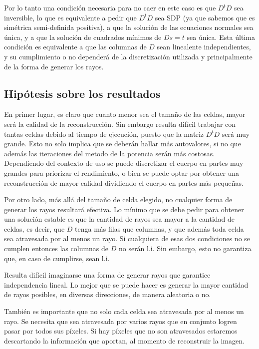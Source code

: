 \documentclass[a4paper]{article}
\begin{document}
Por lo tanto una condición necesaria para no caer en este caso es que $D^tD$ sea inversible, lo que es equivalente a pedir que $D^tD$ sea SDP (ya que 
sabemos que es simétrica semi-definida positiva), a que la solución de las ecuaciones normales sea única, y a que la solución de cuadrados mínimos de 
$Ds = t$ sea única. Esta última condición es equivalente a que las columnas de $D$ sean linealente independientes, y su cumplimiento o no dependerá 
de la discretización utilizada y principalmente de la forma de generar los rayos.

\subsection{Hipótesis sobre los resultados}

En primer lugar, es claro que cuanto menor sea el tamaño de las celdas, mayor será la calidad de la reconstrucción. Sin embargo resulta difícil 
trabajar con tantas celdas debido al tiempo de ejecución, puesto que la matriz $D^tD$ será muy grande. Esto no solo implica que se deberán hallar 
más autovalores, si no que además las iteraciones del metodo de la potencia serán más costosas. Dependiendo del contexto de uso se puede discretizar 
el cuerpo en partes muy grandes para priorizar el rendimiento, o bien se puede optar por obtener una reconstrucción de mayor calidad dividiendo el 
cuerpo en partes más pequeñas.

Por otro lado, más allá del tamaño de celda elegido, no cualquier forma de generar los rayos resultará efectiva. Lo mínimo que se debe pedir para 
obtener una solución estable es que la cantidad de rayos sea mayor a la cantidad de celdas, es decir, que $D$ tenga más filas que columnas, y que 
además toda celda sea atravesada por al menos un rayo. Si cualquiera de esas dos condiciones no se cumplen entonces las columnas de $D$ no serán l.i.
Sin embargo, esto no garantiza que, en caso de cumplirse, sean l.i.

Resulta difícil imaginarse una forma de generar rayos que garantice independencia lineal. Lo mejor que se puede hacer es generar la mayor cantidad de 
rayos posibles, en diversas direcciones, de manera aleatoria o no.

También es importante que no solo cada celda sea atravesada por al menos un rayo. Se necesita que sea atravesada por varios rayos que en conjunto 
logren pasar por todos sus píxeles. Si hay píxeles que no son atravesados estaremos descartando la información que aportan, al momento de reconstruir 
la imagen.
\end{document}
